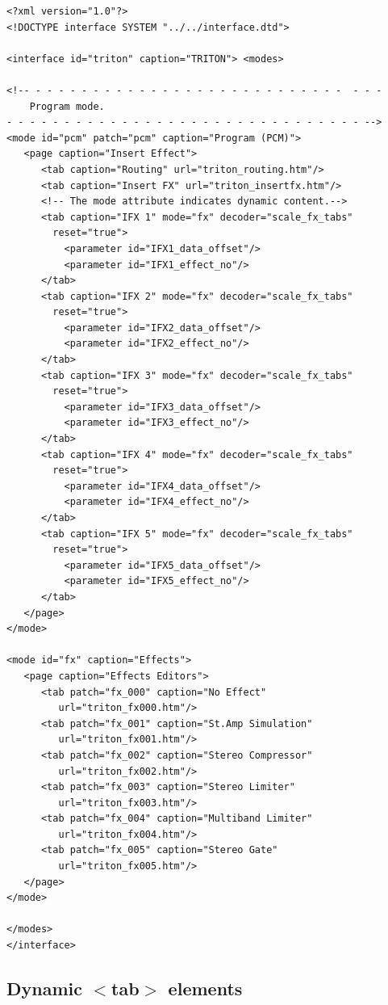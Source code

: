 \documentclass[a4paper,twoside,12pt]{article}
\begin{document}
\begin{verbatim}
<?xml version="1.0"?>
<!DOCTYPE interface SYSTEM "../../interface.dtd">

<interface id="triton" caption="TRITON"> <modes>

<!-- - - - - - - - - - - - - - - - - - - - - - - - - - - -  - - -
    Program mode.
- - - - - - - - - - - - - - - - - - - - - - - - - - - - - - - -->
<mode id="pcm" patch="pcm" caption="Program (PCM)">
   <page caption="Insert Effect">
      <tab caption="Routing" url="triton_routing.htm"/>
      <tab caption="Insert FX" url="triton_insertfx.htm"/>
      <!-- The mode attribute indicates dynamic content.-->
      <tab caption="IFX 1" mode="fx" decoder="scale_fx_tabs"
        reset="true">
          <parameter id="IFX1_data_offset"/>
          <parameter id="IFX1_effect_no"/>
      </tab>
      <tab caption="IFX 2" mode="fx" decoder="scale_fx_tabs"
        reset="true">
          <parameter id="IFX2_data_offset"/>
          <parameter id="IFX2_effect_no"/>
      </tab>
      <tab caption="IFX 3" mode="fx" decoder="scale_fx_tabs"
        reset="true">
          <parameter id="IFX3_data_offset"/>
          <parameter id="IFX3_effect_no"/>
      </tab>
      <tab caption="IFX 4" mode="fx" decoder="scale_fx_tabs"
        reset="true">
          <parameter id="IFX4_data_offset"/>
          <parameter id="IFX4_effect_no"/>
      </tab>
      <tab caption="IFX 5" mode="fx" decoder="scale_fx_tabs"
        reset="true">
          <parameter id="IFX5_data_offset"/>
          <parameter id="IFX5_effect_no"/>
      </tab>
   </page>
</mode>

<mode id="fx" caption="Effects">
   <page caption="Effects Editors">
      <tab patch="fx_000" caption="No Effect"
         url="triton_fx000.htm"/>
      <tab patch="fx_001" caption="St.Amp Simulation"
         url="triton_fx001.htm"/>
      <tab patch="fx_002" caption="Stereo Compressor"
         url="triton_fx002.htm"/>
      <tab patch="fx_003" caption="Stereo Limiter"
         url="triton_fx003.htm"/>
      <tab patch="fx_004" caption="Multiband Limiter"
         url="triton_fx004.htm"/>
      <tab patch="fx_005" caption="Stereo Gate"
         url="triton_fx005.htm"/>
   </page>
</mode>

</modes>
</interface>
\end{verbatim}

\subsection{Dynamic $<$tab$>$ elements}
\end{document}
